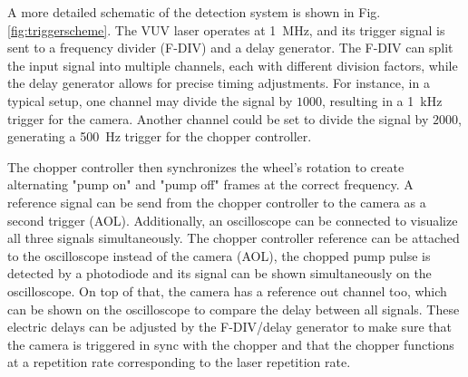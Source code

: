 A more detailed schematic of the detection system is shown in Fig. \ref{fig:triggerscheme}.
The VUV laser operates at \qty{1}{\mega\hertz}, and its trigger signal is sent to a frequency divider (F-DIV) and a delay generator.
The F-DIV can split the input signal into multiple channels, each with different division factors, while the delay generator allows for precise timing adjustments.
For instance, in a typical setup, one channel may divide the signal by $1000$, resulting in a \qty{1}{\kilo\hertz} trigger for the camera. Another channel could be set to divide the signal by $2000$, generating a \qty{500}{\hertz} trigger for the chopper controller.

The chopper controller then synchronizes the wheel's rotation to create alternating "pump on" and "pump off" frames at the correct frequency.
A reference signal can be send from the chopper controller to the camera as a second trigger (AOL).
Additionally, an oscilloscope can be connected to visualize all three signals simultaneously.
The chopper controller reference can be attached to the oscilloscope instead of the camera (AOL), the chopped pump pulse is detected by a photodiode and its signal can be shown simultaneously on the oscilloscope.
On top of that, the camera has a reference out channel too, which can be shown on the oscilloscope to compare the delay between all signals.
These electric delays can be adjusted by the F-DIV/delay generator to make sure that the camera is triggered in sync with the chopper and that the chopper functions at a repetition rate corresponding to the laser repetition rate.

